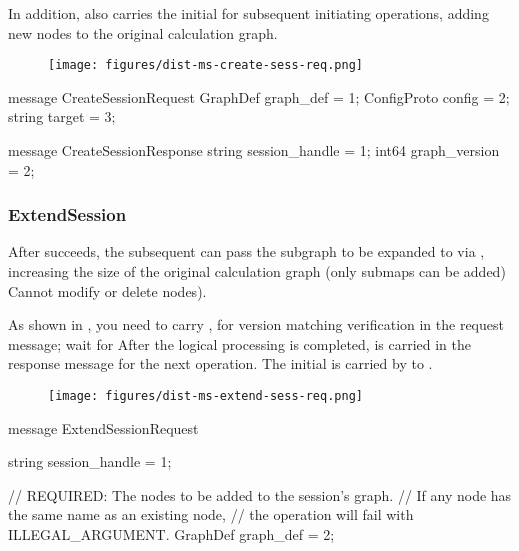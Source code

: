 \begin{content}
In addition,  also carries the initial  for subsequent initiating  operations, adding new nodes to the original calculation graph.

\begin{figure}[H]
  \centering
  \texttt{[image: figures/dist-ms-create-sess-req.png]}
  \caption{}
  \label{fig:dist-ms-create-sess-req}
\end{figure}

\begin{leftbar}
\begin{c++}
message CreateSessionRequest {
  GraphDef graph_def = 1;
  ConfigProto config = 2;
  string target = 3;
}

message CreateSessionResponse {
  string session_handle = 1;
  int64 graph_version = 2;
}
\end{c++}
\end{leftbar}


\subsubsection{ExtendSession}
After  succeeds, the subsequent  can pass the subgraph to be expanded to  via , increasing the size of the original calculation graph (only submaps can be added) Cannot modify or delete nodes).

As shown in , you need to carry ,  for version matching verification in the request message; wait for  After the logical processing is completed,  is carried in the response message for the next  operation. The initial  is carried by  to .

\begin{figure}[H]
  \centering
  \texttt{[image: figures/dist-ms-extend-sess-req.png]}
  \caption{}
  \label{fig:dist-ms-extend-sess-req}
\end{figure}

\begin{leftbar}
\begin{c++}
message ExtendSessionRequest {
  string session_handle = 1;

  // REQUIRED: The nodes to be added to the session's graph. 
  // If any node has the same name as an existing node, 
  // the operation will fail with ILLEGAL\_ARGUMENT.
  GraphDef graph_def = 2;

}
\end{c++}
\end{leftbar}
\end{content}
